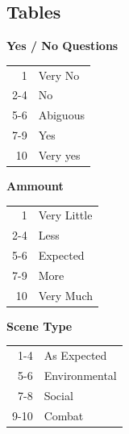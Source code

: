 \documentclass[11pt]{article}
\begin{document}
{\subsection{Tables}
\label{sec:org3c3fc0d}
\begin{multicols}{3}[]
\begin{center}
\textbf{Yes / No Questions}
\begin{center}
\begin{tabular}{rl}
1 & Very No\\
2-4 & No\\
5-6 & Abiguous\\
7-9 & Yes\\
10 & Very yes\\
\end{tabular}
\end{center}
\columnbreak
\textbf{Ammount}
\begin{center}
\begin{tabular}{rl}
1 & Very Little\\
2-4 & Less\\
5-6 & Expected\\
7-9 & More\\
10 & Very Much\\
\end{tabular}
\end{center}
\columnbreak
\textbf{Scene Type}
\begin{center}
\begin{tabular}{rl}
1-4 & As Expected\\
5-6 & Environmental\\
7-8 & Social\\
9-10 & Combat\\
\end{tabular}
\end{center}
\end{center}
\end{multicols}


}
\end{document}
